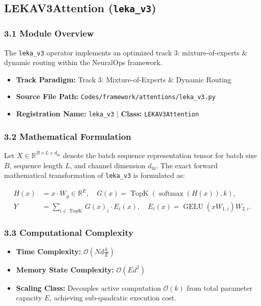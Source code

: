 \subsection{LEKAV3Attention (\texttt{leka\_v3})}
\label{sec:app_module_leka_v3}

\subsubsection*{3.1 Module Overview}
The \texttt{leka\_v3} operator implements an optimized track 3: mixture-of-experts \& dynamic routing within the NeuralOps framework.
\begin{itemize}
    \item \textbf{Track Paradigm:} Track 3: Mixture-of-Experts \& Dynamic Routing
    \item \textbf{Source File Path:} \texttt{Codes/framework/attentions/leka\_v3.py}
    \item \textbf{Registration Name:} \texttt{leka\_v3} $\mid$ \textbf{Class:} \texttt{LEKAV3Attention}
\end{itemize}

\subsubsection*{3.2 Mathematical Formulation}
Let $X \in \mathbb{R}^{B \times L \times d_{\text{in}}}$ denote the batch sequence representation tensor for batch size $B$, sequence length $L$, and channel dimension $d_{\text{in}}$. The exact forward mathematical transformation of \texttt{leka\_v3} is formulated as:

\begin{align}
H(x) &= x \cdot W_g \in \mathbb{R}^{E}, \quad G(x) = \operatorname{TopK}\left(\operatorname{softmax}(H(x)), k\right), \\
Y &= \sum_{i \in \operatorname{TopK}} G(x)_i \cdot E_i(x), \quad E_i(x) = \operatorname{GELU}(x W_{1, i}) W_{2, i}.
\end{align}


\subsubsection*{3.3 Computational Complexity}
\begin{itemize}
    \item \textbf{Time Complexity:} $\mathcal{O}(N d \frac{k}{E})$
    \item \textbf{Memory State Complexity:} $\mathcal{O}(E d^2)$
    \item \textbf{Scaling Class:} Decouples active computation $\mathcal{O}(k)$ from total parameter capacity $E$, achieving sub-quadratic execution cost.
\end{itemize}

